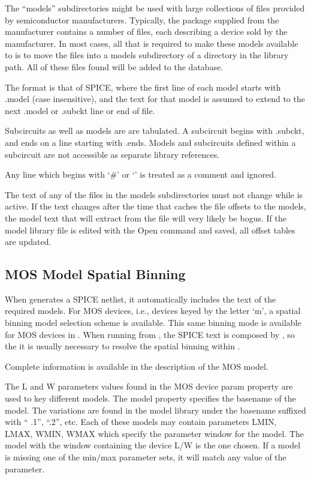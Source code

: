 The ``{\vt models}'' subdirectories might be used with large
collections of files provided by semiconductor manufacturers. 
Typically, the package supplied from the manufacturer contains a
number of files, each describing a device sold by the manufacturer. 
In most cases, all that is required to make these models available to
{\Xic} is to move the files into a {\vt models} subdirectory of a
directory in the library path.  All of these files found will be added
to the database.

The format is that of SPICE, where the first line of each model starts
with {\vt .model} (case insensitive), and the text for that model is
assumed to extend to the next {\vt .model} or {\vt .subckt} line or
end of file.

Subcircuits as well as models are are tabulated.  A subcircuit begins
with {\vt .subckt}, and ends on a line starting with {\vt .ends}. 
Models and subcircuits defined within a subcircuit are not accessible
as separate library references.

Any line which begins with `{\vt \#}' or `{\vt *}' is treated as a
comment and ignored.

The text of any of the files in the {\vt models} subdirectories must
not change while {\Xic} is active.  If the text changes after the time
that {\Xic} caches the file offsets to the models, the model text that
{\Xic} will extract from the file will very likely be bogus.  If the
model library file is edited with the {\cb Open} command and saved,
all offset tables are updated.

\subsection{MOS Model Spatial Binning}
 
When {\Xic} generates a SPICE netlist, it automatically includes the
text of the required models.  For MOS devices, i.e., devices keyed by
the letter `{\vt m}', a spatial binning model selection scheme is
available.  This same binning mode is available for MOS devices in
{\WRspice}.  When running {\WRspice} from {\Xic}, the SPICE text is
composed by {\Xic}, so the it is usually necessary to resolve the
spatial binning within {\Xic}.
 
Complete information is available in the description of the
{\WRspice} MOS model.
 
The {\vt L} and {\vt W} parameters values found in the MOS device {\et
param} property are used to key different models.  The {\et model}
property specifies the basename of the model.  The variations are
found in the model library under the basename suffixed with ``{\vt
.1}'', ``{\vt .2}'', etc.  Each of these models may contain parameters
{\vt LMIN}, {\vt LMAX}, {\vt WMIN}, {\vt WMAX} which specify the
parameter window for the model.  The model with the window containing
the device {\vt L}/{\vt W} is the one chosen.  If a model is missing
one of the min/max parameter sets, it will match any value of the
parameter.
 
